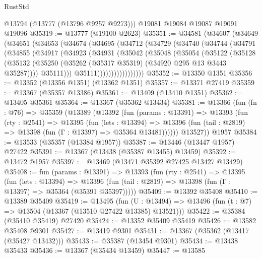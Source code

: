 \begin{lexlean}{RustStd}
\begin{coremodule}
      @13794
      (@13777 (@13796 @9257 @9273)))
    @19081
    @19084
    @19087
    @19091
    @19096
@35319 := @13777 (@19100 @2623)
@35351 := @34581
    (@34607
      (@34649
        (@34651
          (@34653
            (@34674
              (@34695
                (@34712
                  (@34729
                    (@34740
                      (@34744
                        (@34791
                          (@34855
                            (@34917
                              (@34923
                                (@34931
                                  (@35042
                                    (@35048
                                      (@35054
                                        (@35122
                                          (@35128
                                            (@35132
                                              (@35250
                                                (@35262
                                                  (@35317 @35319)
                                                  (@34920 @295 @13 @3443 @35287))))
                                            @35111)))
                                      @35111)))))))))))))))))
@35352 := @13350 @1351
@35356 := @13352 (@13356 @1351) (@13362 @1351)
@35357 := @13371 @27419
@35359 := @13367 (@35357 @13386)
@35361 := @13409 (@13410 @1351)
@35362 := @13405 @35361
@35364 := @13367 (@35362 @13434)
@35381 := @13366
    (fun (fn : @76) =>
    @35359
      (@13389
        (@13392
          (fun (params : @13391) =>
          @13393
            (fun (rty : @2541) =>
            @13395
              (fun (lets : @13394) =>
              @13396 (fun (tail : @2819) => @13398 (fun (Γ : @13397) => @35364 @13481))))))
        @13527))
    @1957
@35384 := @13533 (@35357 (@13384 @1957))
@35387 := @13446 (@13447 @1957) @27422
@35391 := @13367 (@13438 (@35387 @13455) @13459)
@35392 := @13472 @1957
@35397 := @13469 (@13471 @35392 @27425 @13427 @13429)
@35408 := fun (params : @13391) =>
  @13393
    (fun (rty : @2541) =>
    @13395
      (fun (lets : @13394) =>
      @13396 (fun (tail : @2819) => @13398 (fun (Γ : @13397) => @35364 (@35391 @35397)))))
@35409 := @13392 @35408
@35410 := @13389 @35409
@35419 := @13495
    (fun (U : @13494) => @13496 (fun (t : @7) => @13504 (@13367 (@13510 @27422 @13385) @13521)))
@35422 := @35384 (@35410 @35419) @27420
@35424 := @13352 @35409 @35419
@35426 := @13582 @35408 @9301
@35427 := @13419 @9301
@35431 := @13367 (@35362 (@13417 (@35427 @13432)))
@35433 := @35387 (@13454 @9301)
@35434 := @13438 @35433
@35436 := @13367 (@35434 @13459)
@35447 := @13585

\end{coremodule}
\end{lexlean}
